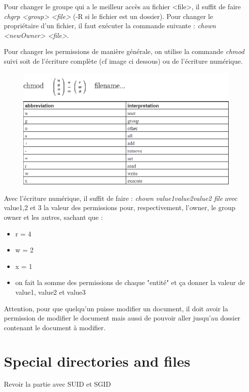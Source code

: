 \documentclass{article}
\begin{document}
\noindent Pour changer le groupe qui a le meilleur accès au fichier <file>, il suffit de faire \textit{chgrp <group> <file>} (-R si le fichier est un dossier).\newline
Pour changer le propriétaire d'un fichier, il faut exécuter la commande suivante : \textit{chown <newOwner> <file>}.

Pour changer les permissions de manière générale, on utilise la commande \textit{chmod} suivi soit de l'écriture complète (cf image ci dessous) ou de l'écriture numérique.
\begin{figure}[h]
    \centering
    \includegraphics[scale=0.3]{Images/Permissions.png}
\end{figure}

Avec l'écriture numérique, il suffit de faire : \textit{chown value1value2value2 file} avec value1,2 et 3 la valeur des permissions pour, respectivement, l'owner, le group owner et les autres, sachant que :
\begin{itemize}
    \item r = 4
    \item w = 2
    \item x = 1
    \item on fait la somme des permissions de chaque "entité" et ça donner la valeur de value1, value2 et value3
\end{itemize}

\noindent Attention, pour que quelqu'un puisse modifier un document, il doit avoir la permission de modifier le document mais aussi de pouvoir aller jusqu'au dossier contenant le document à modifier.

\newpage
\section{Special directories and files}
Revoir la partie avec SUID et SGID
\end{document}
